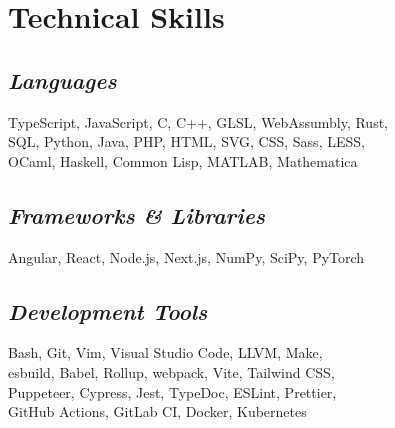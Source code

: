 \documentclass[11pt]{article}
\begin{document}
\begin{minipage}{280pt}
\section*{\sc Technical Skills}
\subsection*{\it Languages}
TypeScript, JavaScript, C, C++, GLSL, WebAssumbly, Rust,\\
SQL, Python, Java, PHP, HTML, SVG, CSS, Sass, LESS,\\
OCaml, Haskell, Common Lisp, MATLAB, Mathematica

\subsection*{\it Frameworks \& Libraries}
Angular, React, Node.js, Next.js, NumPy, SciPy, PyTorch

\subsection*{\it Development Tools}
Bash, Git, Vim, Visual Studio Code, LLVM, Make,\\
esbuild, Babel, Rollup, webpack, Vite, Tailwind CSS,\\
Puppeteer, Cypress, Jest, TypeDoc, ESLint, Prettier, \\
GitHub Actions, GitLab CI, Docker, Kubernetes

\end{minipage}
\end{document}
